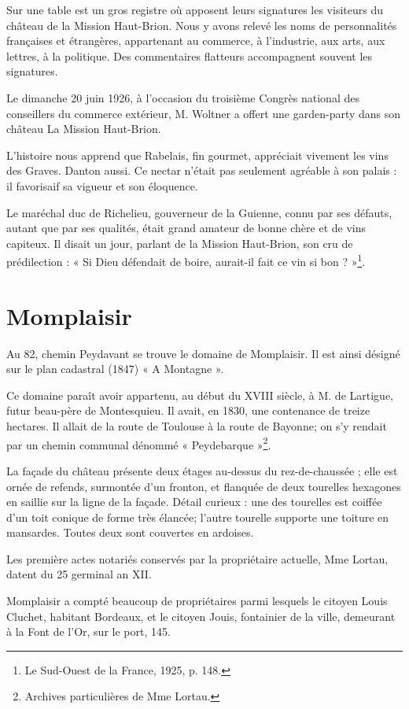 Sur une table est un gros registre où apposent leurs signatures les visiteurs du château de la Mission Haut-Brion. Nous y avons relevé les noms de personnalités françaises et étrangères, appartenant au commerce, à l'industrie, aux arts, aux lettres, à la politique. Des commentaires flatteurs accompagnent souvent les signatures.

Le dimanche 20 juin 1926, à l'occasion du troisième Congrès national des conseillers du commerce extérieur, M. Woltner a offert une garden-party dans son château La Mission Haut-Brion.

L'histoire nous apprend que Rabelais, fin gourmet, appréciait vivement les vins des Graves. Danton aussi. Ce nectar n'était pas seulement agréable à son palais : il favorisaif sa vigueur et son éloquence.

Le maréchal duc de Richelieu, gouverneur de la Guienne, connu par ses défauts, autant que par ses qualités, était grand amateur de bonne chère et de vins capiteux. Il disait un jour, parlant de la Mission Haut-Brion, son cru de prédilection : « Si Dieu défendait de boire, aurait-il fait ce vin si bon ? »\footnote{Le Sud-Ouest de la France, 1925, p. 148.}.

\section{Momplaisir}

Au 82, chemin Peydavant se trouve le domaine de Momplaisir. Il est ainsi désigné sur le plan cadastral (1847) « A Montagne ».

Ce domaine paraît avoir appartenu, au début du XVIII\ieme{} siècle, à M. de Lartigue, futur beau-père de Montesquieu. Il avait, en 1830, une contenance de treize hectares. Il allait de la route de Toulouse à la route de Bayonne; on s'y rendait par un chemin communal dénommé 
« Peydebarque »\footnote{Archives particulières de Mme Lortau.}.

La façade du château présente deux étages au-dessus du rez-de-chaussée ; elle est ornée de refends, surmontée d'un fronton, et flanquée de deux tourelles hexagones en saillie sur la ligne de la façade. Détail curieux : une des tourelles est coiffée d'un toit conique de forme très élancée; l'autre tourelle supporte une toiture en mansardes. Toutes deux sont couvertes en ardoises.

Les première actes notariés conservés par la propriétaire actuelle, Mme Lortau, datent du 25 germinal an XII.

Momplaisir a compté beaucoup de propriétaires parmi lesquels le citoyen Louis Cluchet, habitant Bordeaux, et le citoyen Jouis, fontainier de la ville, demeurant à la Font de l'Or, sur le port, 145.

